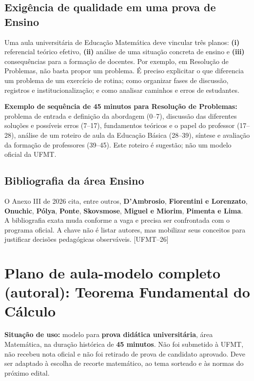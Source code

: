 \documentclass[11pt,a4paper]{article}
\newcommand{\fufmt}{\textsf{[UFMT--26]}}
\begin{document}
\subsection{Exigência de qualidade em uma prova de Ensino}
Uma aula universitária de Educação Matemática deve vincular três planos: \textbf{(i)} referencial teórico efetivo, \textbf{(ii)} análise de uma situação concreta de ensino e \textbf{(iii)} consequências para a formação de docentes. Por exemplo, em Resolução de Problemas, não basta propor um problema. É preciso explicitar o que diferencia um problema de um exercício de rotina; como organizar fases de discussão, registros e institucionalização; e como analisar caminhos e erros de estudantes.

\textbf{Exemplo de sequência de 45 minutos para Resolução de Problemas:} problema de entrada e definição da abordagem (0--7), discussão das diferentes soluções e possíveis erros (7--17), fundamentos teóricos e o papel do professor (17--28), análise de um roteiro de aula da Educação Básica (28--39), síntese e avaliação da formação de professores (39--45). Este roteiro é sugestão; não um modelo oficial da UFMT.

\subsection{Bibliografia da área Ensino}
O Anexo III de 2026 cita, entre outros, \textbf{D'Ambrosio}, \textbf{Fiorentini e Lorenzato}, \textbf{Onuchic}, \textbf{Pólya}, \textbf{Ponte}, \textbf{Skovsmose}, \textbf{Miguel e Miorim}, \textbf{Pimenta e Lima}. A bibliografia exata muda conforme a vaga e precisa ser confrontada com o programa oficial. A chave não é listar autores, mas mobilizar seus conceitos para justificar decisões pedagógicas observáveis. \fufmt

\section{Plano de aula-modelo completo (autoral): Teorema Fundamental do Cálculo}
\begin{ideia}
\textbf{Situação de uso:} modelo para \textbf{prova didática universitária}, área Matemática, na duração histórica de \textbf{45 minutos}. Não foi submetido à UFMT, não recebeu nota oficial e não foi retirado de prova de candidato aprovado. Deve ser adaptado à escolha de recorte matemático, ao tema sorteado e às normas do próximo edital.
\end{ideia}
\end{document}
